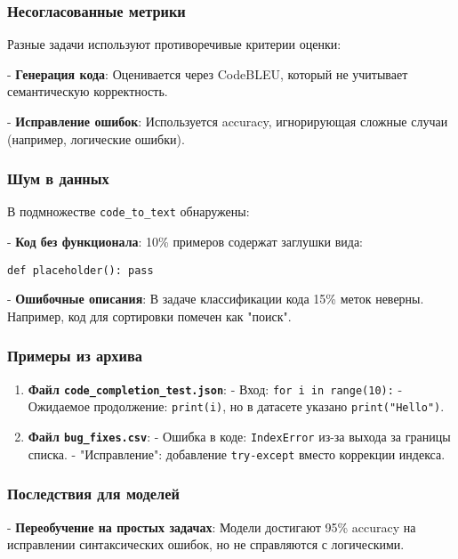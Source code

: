 \documentclass[14pt]{article}
\theoremstyle{definition}
\begin{document}
\subsubsection{Несогласованные метрики}

Разные задачи используют противоречивые критерии оценки:

    
- \textbf{Генерация кода}: Оценивается через CodeBLEU, который не учитывает семантическую корректность.
    
- \textbf{Исправление ошибок}: Используется accuracy, игнорирующая сложные случаи (например, логические ошибки).


\subsubsection{Шум в данных}

В подмножестве \texttt{code\_to\_text} обнаружены:

    
- \textbf{Код без функционала}: 10\% примеров содержат заглушки вида:
    \begin{verbatim}
def placeholder(): pass
    \end{verbatim}
    
- \textbf{Ошибочные описания}: В задаче классификации кода 15\% меток неверны. Например, код для сортировки помечен как "поиск".


\subsubsection{Примеры из архива}

\begin{enumerate}
    \item \textbf{Файл \texttt{code\_completion\_test.json}}:  
      - Вход: \texttt{for i in range(10):}  
      - Ожидаемое продолжение: \texttt{print(i)}, но в датасете указано \texttt{print("Hello")}.
    \item \textbf{Файл \texttt{bug\_fixes.csv}}:  
      - Ошибка в коде: \texttt{IndexError} из-за выхода за границы списка.  
      - "Исправление": добавление \texttt{try-except} вместо коррекции индекса.
\end{enumerate}

\subsubsection{Последствия для моделей}


    
- \textbf{Переобучение на простых задачах}: Модели достигают 95\% accuracy на исправлении синтаксических ошибок, но не справляются с логическими.
    
\end{document}

